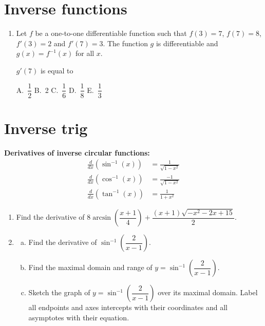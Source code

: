 \documentclass[12pt]{article}
\begin{document}
\section*{Inverse functions}

\begin{enumerate}
    \item Let $f$ be a one-to-one differentiable function such that $f(3)=7$, $f(7)=8$, $f'(3)=2$ and $f'(7)=3$. The function $g$ is differentiable and $g(x) = f^{-1}(x)$ for all $x$. 
    
    $g'(7)$ is equal to
    
    \vspace{0.5cm}
    A.\ $\dfrac{1}{2}$ \qquad B.\ 2 \qquad C.\ $\dfrac{1}{6}$ \qquad D.\ $\dfrac{1}{8}$ \qquad E.\ $\dfrac{1}{3}$
\end{enumerate}

\vspace{2cm}

\section*{Inverse trig}

\noindent \textbf{Derivatives of inverse circular functions:}
\begin{align*}
    \frac{d}{dx}(\sin^{-1}(x)) &= \frac{1}{\sqrt{1-x^2}} \\[1ex]
    \frac{d}{dx}(\cos^{-1}(x)) &= \frac{-1}{\sqrt{1-x^2}} \\[1ex]
    \frac{d}{dx}(\tan^{-1}(x)) &= \frac{1}{1+x^2}
\end{align*}

\vspace{2cm}

\begin{enumerate}
    \item Find the derivative of $8\arcsin\left(\dfrac{x+1}{4}\right) + \dfrac{(x+1)\sqrt{-x^2-2x+15}}{2}$.
    
    \vspace{2cm}
    
    \item 
    \begin{enumerate}[a.]
        \item Find the derivative of $\sin^{-1}\left(\dfrac{2}{x-1}\right)$.
        
        \vspace{2cm}
        
        \item Find the maximal domain and range of $y = \sin^{-1}\left(\dfrac{2}{x-1}\right)$.
        
        \vspace{2cm}
        
        \item Sketch the graph of $y = \sin^{-1}\left(\dfrac{2}{x-1}\right)$ over its maximal domain. Label all endpoints and axes intercepts with their coordinates and all asymptotes with their equation.
    \end{enumerate}
\end{enumerate}
\end{document}
